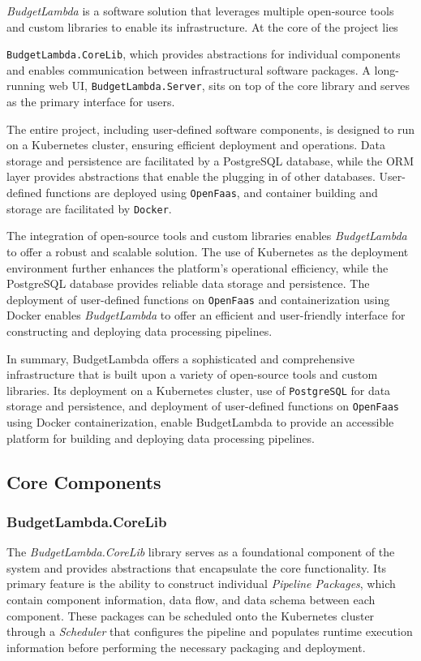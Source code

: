\documentclass[fleqn,10pt]{SelfArx} %
\begin{document}
\indent \emph{BudgetLambda} is a software solution that leverages multiple open-source tools and custom libraries to enable its infrastructure. At the core of the project lies \par \noindent
\texttt{BudgetLambda.CoreLib}, which provides abstractions for individual components and enables communication between infrastructural software packages. A long-running web UI, \texttt{BudgetLambda.Server}, sits on top of the core library and serves as the primary interface for users.

The entire project, including user-defined software components, is designed to run on a Kubernetes cluster, ensuring efficient deployment and operations. Data storage and persistence are facilitated by a PostgreSQL database, while the ORM layer provides abstractions that enable the plugging in of other databases. User-defined functions are deployed using \texttt{OpenFaas}, and container building and storage are facilitated by \texttt{Docker}.

The integration of open-source tools and custom libraries enables \emph{BudgetLambda} to offer a robust and scalable solution. The use of Kubernetes as the deployment environment further enhances the platform's operational efficiency, while the PostgreSQL database provides reliable data storage and persistence. The deployment of user-defined functions on \texttt{OpenFaas} and containerization using Docker enables \emph{BudgetLambda} to offer an efficient and user-friendly interface for constructing and deploying data processing pipelines.

In summary, BudgetLambda offers a sophisticated and comprehensive infrastructure that is built upon a variety of open-source tools and custom libraries. Its deployment on a Kubernetes cluster, use of \texttt{PostgreSQL} for data storage and persistence, and deployment of user-defined functions on \texttt{OpenFaas} using Docker containerization, enable BudgetLambda to provide an accessible platform for building and deploying data processing pipelines.

\subsection{Core Components}

\subsubsection{BudgetLambda.CoreLib}

The \emph{BudgetLambda.CoreLib} library serves as a foundational component of the system and provides abstractions that encapsulate the core functionality. Its primary feature is the ability to construct individual \emph{Pipeline Packages}, which contain component information, data flow, and data schema between each component. These packages can be scheduled onto the Kubernetes cluster through a \emph{Scheduler} that configures the pipeline and populates runtime execution information before performing the necessary packaging and deployment.
\end{document}
